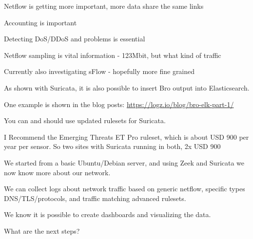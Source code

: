 \documentclass[20pt,landscape,a4paper,footrule]{foils}
\begin{document}


\begin{slidelist}
\item Netflow is getting more important, more data share the same links
\item Accounting is important
\item Detecting DoS/DDoS and problems is essential
\item Netflow sampling is vital information - 123Mbit, but what kind of traffic
\item Currently also investigating sFlow - hopefully more fine grained
\end{slidelist}





As shown with Suricata, it is also possible to insert Bro output into Elasticsearch.

One example is shown in the blog posts:
\url{https://logz.io/blog/bro-elk-part-1/}



You can and should use updated rulesets for Suricata.

I Recommend the Emerging Threats ET Pro ruleset, which is about USD 900 per year per sensor. So two sites with Suricata running in both, 2x USD 900


We started from a basic Ubuntu/Debian server, and using Zeek and Suricata we now know more about our network.

We can collect logs about network traffic based on generic netflow, specific types DNS/TLS/protocols, and traffic matching advanced rulesets.

We know it is possible to create dashboards and visualizing the data.

What are the next steps?


\myquestionspage
\end{document}

